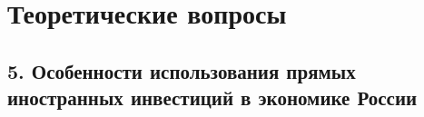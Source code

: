 \section{Теоретические вопросы}
\subsection*{5. Особенности использования прямых иностранных инвестиций в экономике России}

